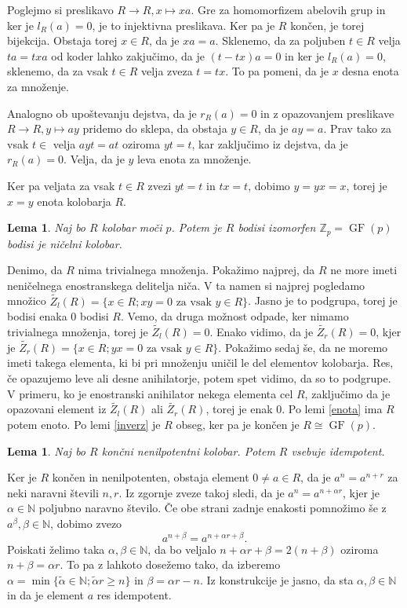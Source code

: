 \documentclass[a4paper, 12pt]{amsart}
\theoremstyle{definition} %
\theoremstyle{plain} %
\newtheorem{lema}[definicija]{Lema}
\newcommand{\N}{\mathbb N}
\newcommand{\Z}{\mathbb Z}
\DeclareMathOperator{\GF}{GF}
\begin{document}
\proof
Poglejmo si preslikavo $R \rightarrow R, x\mapsto xa$. Gre za homomorfizem abelovih grup in ker je $l_R(a) = 0$, je to injektivna preslikava. Ker pa je $R$ končen, je torej bijekcija. Obstaja torej $x \in R$, da je $xa = a$. Sklenemo, da za poljuben $t\in R$ velja $ta = txa$ od koder lahko zakjučimo, da je $(t-tx)a = 0$ in ker je $l_R(a) = 0$, sklenemo, da  za vsak $t\in R$ velja zveza $t = tx$. To pa pomeni, da je $x$ desna enota za množenje.

Analogno ob upoštevanju dejstva, da je $r_R(a) = 0$ in z opazovanjem preslikave $R\rightarrow R, y \mapsto ay$ pridemo do sklepa, da obstaja $y \in R$, da je $ay=a$. Prav tako za vsak $t\in $ velja $ayt = at$ oziroma $yt=t$, kar zaključimo iz dejstva, da je $r_R(a) =0$. Velja, da je $y$ leva enota za množenje.

Ker pa veljata za vsak $t\in R$ zvezi $yt=t$ in $tx=t$, dobimo $y=yx=x$, torej je $x=y$ enota kolobarja $R$.
\endproof

\begin{lema}
\label{pkolobar}
Naj bo $R$ kolobar moči $p$. Potem je $R$ bodisi izomorfen $\Z_p = \GF(p)$ bodisi je ničelni kolobar.
\end{lema} 

\proof
Denimo, da $R$ nima trivialnega množenja. Pokažimo najprej, da $R$ ne more imeti neničelnega enostranskega delitelja niča. V ta namen si najprej pogledamo množico $\tilde{Z_l}(R) = \{x\in R; xy = 0 \text{ za vsak } y\in R\}$. Jasno je to podgrupa, torej je bodisi enaka 0 bodisi $R$. Vemo, da druga možnost odpade, ker nimamo trivialnega množenja, torej je $\tilde{Z_l}(R) = 0$. Enako vidimo, da je $\tilde{Z_r}(R) = 0$, kjer je $\tilde{Z_r}(R) = \{x\in R; yx = 0 \text{ za vsak } y\in R\}$. Pokažimo sedaj še, da ne moremo imeti takega elementa, ki bi pri množenju uničil le del elementov kolobarja. Res, če opazujemo leve ali desne anihilatorje, potem spet vidimo, da so to podgrupe. V primeru, ko je enostranski anihilator nekega elementa cel $R$, zaključimo da je opazovani element iz $\tilde{Z_l}(R)$ ali $\tilde{Z_r}(R)$, torej je enak 0. Po lemi \ref{enota} ima $R$ potem enoto. Po lemi \ref{inverz} je $R$ obseg, ker pa je končen je $R\cong \GF(p)$.
\endproof

\begin{lema}
\label{idempotent}
Naj bo $R$ končni nenilpotentni kolobar. Potem $R$ vsebuje idempotent.
\end{lema}

\proof
Ker je $R$ končen in nenilpotenten, obstaja element $0\neq a\in R$, da je $a^n = a^{n+r}$ za neki naravni števili $n,r$. Iz zgornje zveze takoj sledi, da je $a^n = a^{n+ \alpha r}$, kjer je $\alpha \in \N$ poljubno naravno število. Če obe strani zadnje enakosti pomnožimo še z $a^\beta, \beta \in \N$, dobimo zvezo
$$
a^{n+\beta} = a^{n+\alpha r +\beta}.
$$ 
Poiskati želimo taka $\alpha,\beta \in \N$, da bo veljalo $n+ \alpha r +\beta = 2(n+ \beta)$ oziroma $n+ \beta = \alpha r$. To pa z lahkoto dosežemo tako, da izberemo $ \alpha = \min\{\tilde{\alpha} \in \N; \tilde{\alpha} r \ge n \}$ in $\beta = \alpha r - n$. Iz konstrukcije je jasno, da sta $\alpha, \beta \in \N$ in da je element $a$ res idempotent.
\endproof
\end{document}
